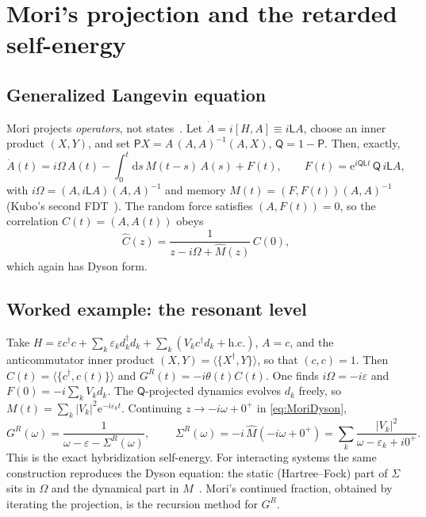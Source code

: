 \documentclass[11pt]{article}
\newcommand{\ee}{\mathrm{e}}
\newcommand{\dd}{\mathrm{d}}
\newcommand{\avg}[1]{\langle#1\rangle}
\begin{document}
\section{Mori's projection and the retarded self-energy}
\label{sec:mori}

\subsection{Generalized Langevin equation}
Mori projects \emph{operators}, not states~\cite{Mori1965,ZwanzigBook,Forster1975}. Let
$\dot A=i[H,A]\equiv i\mathsf{L}A$, choose an inner product $(X,Y)$, and set
$\mathsf{P}X=A\,(A,A)^{-1}(A,X)$, $\mathsf{Q}=1-\mathsf{P}$. Then, exactly,
\begin{equation}
  \dot A(t)=i\Omega\,A(t)-\int_0^t\!\dd s\,M(t-s)\,A(s)+F(t),\qquad
  F(t)=\ee^{i\mathsf{QL}t}\,\mathsf{Q}\,i\mathsf{L}A,
  \label{eq:GLE}
\end{equation}
with $i\Omega=(A,i\mathsf{L}A)(A,A)^{-1}$ and memory $M(t)=(F,F(t))(A,A)^{-1}$
(Kubo's second FDT~\cite{Kubo1966}). The random force satisfies $(A,F(t))=0$, so the correlation
$C(t)=(A,A(t))$ obeys
\begin{equation}
  \hat C(z)=\frac{1}{z-i\Omega+\hat M(z)}\,C(0),
  \label{eq:MoriDyson}
\end{equation}
which again has Dyson form.

\subsection{Worked example: the resonant level}
Take $H=\varepsilon c^\dagger c+\sum_k\varepsilon_kd_k^\dagger d_k+\sum_k(V_kc^\dagger d_k+\text{h.c.})$,
$A=c$, and the anticommutator inner product $(X,Y)=\avg{\{X^\dagger,Y\}}$, so that $(c,c)=1$. Then
$C(t)=\avg{\{c^\dagger,c(t)\}}$ and $G^R(t)=-i\theta(t)C(t)$. One finds $i\Omega=-i\varepsilon$ and
$F(0)=-i\sum_kV_kd_k$. The $\mathsf{Q}$-projected dynamics evolves $d_k$ freely, so
$M(t)=\sum_k|V_k|^2\ee^{-i\varepsilon_kt}$. Continuing $z\to-i\omega+0^+$ in \cref{eq:MoriDyson},
\begin{equation}
  G^R(\omega)=\frac{1}{\omega-\varepsilon-\Sigma^R(\omega)},\qquad
  \boxed{\;\Sigma^R(\omega)=-i\,\hat M(-i\omega+0^+)=\sum_k\frac{|V_k|^2}{\omega-\varepsilon_k+i0^+}.\;}
\end{equation}
This is the exact hybridization self-energy. For interacting systems the same
construction reproduces the Dyson equation: the static (Hartree--Fock) part of $\Sigma$
sits in $\Omega$ and the dynamical part in $M$~\cite{Fulde1995}. Mori's continued fraction,
obtained by iterating the projection, is the recursion method for $G^R$.
\end{document}
